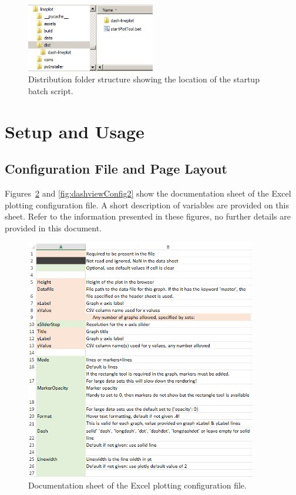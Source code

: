 \begin{figure}[h]
\centering
\includegraphics[width=0.5\textwidth]{pic/folderDistEx}
\caption{Distribution folder structure showing the location of the startup batch script.
\label{fig:folderdistEx}}
\end{figure}


\section{Setup and Usage}


\subsection{Configuration File and Page Layout}

Figures~\ref{fig:dashviewConfig1} and \ref{fig:dashviewConfig2} show the documentation sheet of the Excel plotting configuration file. A short description of variables are provided on this sheet. Refer to the information presented in these figures, no further details are provided in this document.

\begin{figure}[h]
\centering
\includegraphics[width=0.90\textwidth]{pic/dashview-config1}
\caption{Documentation sheet of the Excel plotting configuration file.
\label{fig:dashviewConfig1}}
\end{figure}

